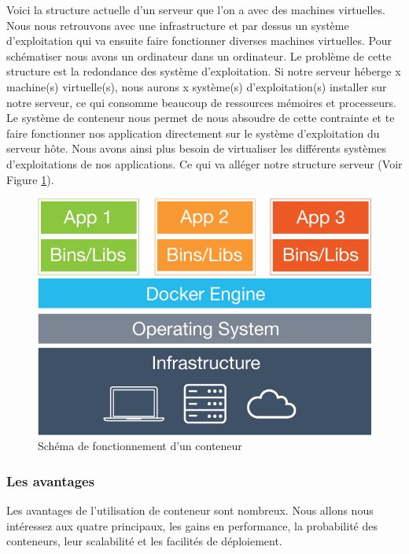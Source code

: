 \documentclass{report}
\begin{document}
        Voici la structure actuelle d’un serveur que l’on a avec des machines virtuelles. Nous nous retrouvons avec une infrastructure et par dessus un système d’exploitation qui va ensuite faire fonctionner diverses machines virtuelles. Pour schématiser nous avons un ordinateur dans un ordinateur. Le problème de cette structure est la redondance des système d’exploitation. Si notre serveur héberge x machine(s) virtuelle(s), nous aurons x système(s) d’exploitation(s) installer sur notre serveur, ce qui consomme beaucoup de ressources mémoires et processeurs.\\

        Le système de conteneur nous permet de nous absoudre de cette contrainte et te faire fonctionner nos application directement sur le système d’exploitation du serveur hôte. Nous avons ainsi plus besoin de virtualiser les différents systèmes d’exploitations de nos applications. Ce qui va alléger notre structure serveur (Voir Figure \ref{Container}).\\

        \begin{figure}
          \begin{center}
            \includegraphics[scale=0.2]{images/container.png}
          \end{center}
          \caption{Schéma de fonctionnement d'un conteneur}
          \label{Container}
        \end{figure}

        \subsubsection{Les avantages}
        Les avantages de l’utilisation de conteneur sont nombreux. Nous allons nous intéressez aux quatre principaux, les gains en performance, la probabilité des conteneurs, leur scalabilité et les facilités de déploiement.\\
\end{document}
